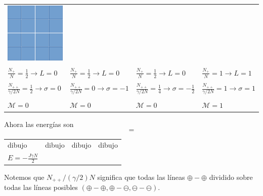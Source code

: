 \documentclass[10pt,oneside]{CBFT_book}
\begin{document}
\begin{center}
\begin{tabular}{l|l|l|l}
\includegraphics[scale=0.3]{images/fig_ajedrez4.pdf} \\
 & & & \\
$ \displaystyle \frac{N_+}{N} =\frac{1}{2} \to L=0 $ & $ \displaystyle \frac{N_+}{N} =\frac{1}{2} \to L=0 $ & 
$ \displaystyle \frac{N_+}{N} =\frac{1}{2} \to L=0 $ & $ \displaystyle \frac{N_+}{N} =1 \to L=1 $ \\
 & & & \\
$ \displaystyle \frac{N_{++}}{\gamma/2 N} =\frac{1}{2} \to \sigma=0 $ & 
$ \displaystyle \frac{N_{++}}{\gamma/2 N} = 0 \to \sigma=-1 $ & 
$ \displaystyle \frac{N_{++}}{\gamma/2 N} =\frac{1}{4} \to \sigma=-\frac{1}{2} $ & 
$\displaystyle \frac{N_{++}}{\gamma/2 N} = 1 \to \sigma=1$ \\
 & & & \\
$\mathcal{M}=0$ & $\mathcal{M}=0$ & $\mathcal{M}=0$ & $\mathcal{M}=1$
\end{tabular}
\end{center}

Ahora las energías son
\[=\]
\begin{center}
\begin{tabular}{l|l|l|l}
dibujo & dibujo & dibujo & dibujo \\
 $E=-\frac{J\gamma N}{2}$ & & & 
\end{tabular}
\end{center}

Notemos que $N_{++}/(\gamma/2)N$ significa que todas las líneas $\oplus - \oplus$ dividido sobre todas
las líneas posibles $(\oplus - \oplus, \oplus - \ominus, \ominus - \ominus)$.
\end{document}
